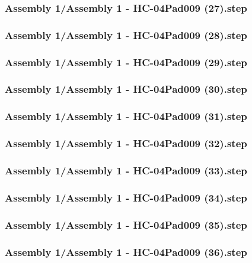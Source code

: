 \documentclass[a4paper,12pt]{article}
\begin{document}
\subsubsection{Assembly 1/Assembly 1 - HC-04Pad009 (27).step}

\subsubsection{Assembly 1/Assembly 1 - HC-04Pad009 (28).step}

\subsubsection{Assembly 1/Assembly 1 - HC-04Pad009 (29).step}

\subsubsection{Assembly 1/Assembly 1 - HC-04Pad009 (30).step}

\subsubsection{Assembly 1/Assembly 1 - HC-04Pad009 (31).step}

\subsubsection{Assembly 1/Assembly 1 - HC-04Pad009 (32).step}

\subsubsection{Assembly 1/Assembly 1 - HC-04Pad009 (33).step}

\subsubsection{Assembly 1/Assembly 1 - HC-04Pad009 (34).step}

\subsubsection{Assembly 1/Assembly 1 - HC-04Pad009 (35).step}

\subsubsection{Assembly 1/Assembly 1 - HC-04Pad009 (36).step}

\end{document}

